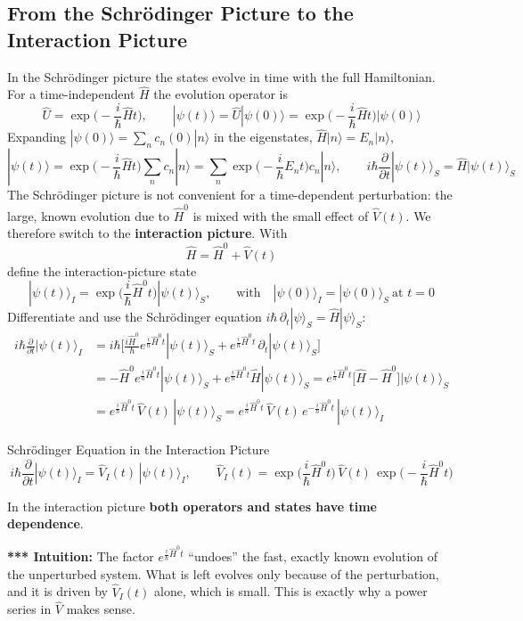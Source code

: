 \documentclass[11pt,a4paper]{article}
\begin{document}
\subsection{From the Schr\"odinger Picture to the Interaction Picture}
In the Schr\"odinger picture the states evolve in time with the full Hamiltonian. For a time-independent $\hat H$ the evolution operator is
\[
\hat U = \exp\Big(-\frac i\hbar\hat Ht\Big), \qquad |\psi(t)\rangle = \hat U|\psi(0)\rangle = \exp\Big(-\frac i\hbar\hat Ht\Big)|\psi(0)\rangle
\]
Expanding $|\psi(0)\rangle=\sum_n c_n(0)|n\rangle$ in the eigenstates, $\hat H|n\rangle=E_n|n\rangle$,
\[
|\psi(t)\rangle = \exp\Big(-\frac i\hbar\hat Ht\Big)\sum_nc_n|n\rangle = \sum_n\exp\Big(-\frac i\hbar E_nt\Big)c_n|n\rangle,
\qquad
i\hbar\frac\partial{\partial t}|\psi(t)\rangle_S = \hat H|\psi(t)\rangle_S
\]
The Schr\"odinger picture is not convenient for a time-dependent perturbation: the large, known evolution due to $\hat H^0$ is mixed with the small effect of $\hat V(t)$. We therefore switch to the \textbf{interaction picture}. With
\[
\hat H = \hat H^0 + \hat V(t)
\]
define the interaction-picture state
\[
|\psi(t)\rangle_I = \exp\Big(\frac i\hbar\hat H^0t\Big)|\psi(t)\rangle_S, \qquad\text{with}\quad |\psi(0)\rangle_I=|\psi(0)\rangle_S\ \text{at } t=0
\]
Differentiate and use the Schr\"odinger equation $i\hbar\,\partial_t|\psi\rangle_S=\hat H|\psi\rangle_S$:
\begin{align*}
i\hbar\frac\partial{\partial t}|\psi(t)\rangle_I &= i\hbar\Big[\frac{i\hat H^0}{\hbar}e^{\frac i\hbar\hat H^0t}|\psi(t)\rangle_S + e^{\frac i\hbar\hat H^0t}\,\partial_t|\psi(t)\rangle_S\Big]\\
&= -\hat H^0e^{\frac i\hbar\hat H^0t}|\psi(t)\rangle_S + e^{\frac i\hbar\hat H^0t}\hat H|\psi(t)\rangle_S
= e^{\frac i\hbar\hat H^0t}\big[\hat H-\hat H^0\big]|\psi(t)\rangle_S\\
&= e^{\frac i\hbar\hat H^0t}\,\hat V(t)\,|\psi(t)\rangle_S
= e^{\frac i\hbar\hat H^0t}\,\hat V(t)\,e^{-\frac i\hbar\hat H^0t}\,|\psi(t)\rangle_I
\end{align*}
\begin{thm}{Schr\"odinger Equation in the Interaction Picture}
\[
i\hbar\frac\partial{\partial t}|\psi(t)\rangle_I = \hat V_I(t)\,|\psi(t)\rangle_I, \qquad
\hat V_I(t) = \exp\Big(\frac i\hbar\hat H^0t\Big)\,\hat V(t)\,\exp\Big(-\frac i\hbar\hat H^0t\Big)
\]
\end{thm}
In the interaction picture \textbf{both operators and states have time dependence}.

\textbf{*** Intuition:} The factor $e^{\frac i\hbar\hat H^0t}$ ``undoes'' the fast, exactly known evolution of the unperturbed system. What is left evolves only because of the perturbation, and it is driven by $\hat V_I(t)$ alone, which is small. This is exactly why a power series in $\hat V$ makes sense.
\end{document}

